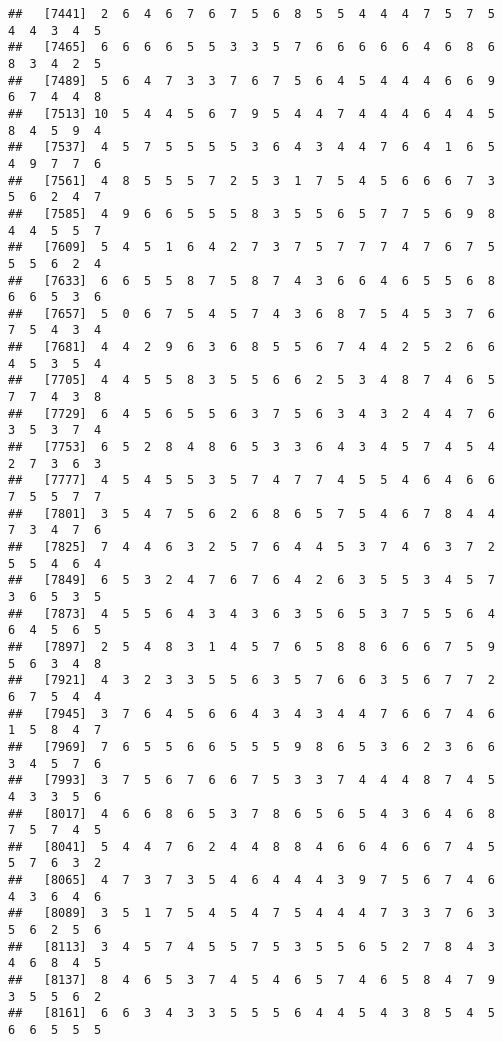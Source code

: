 \documentclass[
]{book}
\begin{document}
\begin{verbatim}
##   [7441]  2  6  4  6  7  6  7  5  6  8  5  5  4  4  4  7  5  7  5  4  4  3  4  5
##   [7465]  6  6  6  6  5  5  3  3  5  7  6  6  6  6  6  4  6  8  6  8  3  4  2  5
##   [7489]  5  6  4  7  3  3  7  6  7  5  6  4  5  4  4  4  6  6  9  6  7  4  4  8
##   [7513] 10  5  4  4  5  6  7  9  5  4  4  7  4  4  4  6  4  4  5  8  4  5  9  4
##   [7537]  4  5  7  5  5  5  5  3  6  4  3  4  4  7  6  4  1  6  5  4  9  7  7  6
##   [7561]  4  8  5  5  5  7  2  5  3  1  7  5  4  5  6  6  6  7  3  5  6  2  4  7
##   [7585]  4  9  6  6  5  5  5  8  3  5  5  6  5  7  7  5  6  9  8  4  4  5  5  7
##   [7609]  5  4  5  1  6  4  2  7  3  7  5  7  7  7  4  7  6  7  5  5  5  6  2  4
##   [7633]  6  6  5  5  8  7  5  8  7  4  3  6  6  4  6  5  5  6  8  6  6  5  3  6
##   [7657]  5  0  6  7  5  4  5  7  4  3  6  8  7  5  4  5  3  7  6  7  5  4  3  4
##   [7681]  4  4  2  9  6  3  6  8  5  5  6  7  4  4  2  5  2  6  6  4  5  3  5  4
##   [7705]  4  4  5  5  8  3  5  5  6  6  2  5  3  4  8  7  4  6  5  7  7  4  3  8
##   [7729]  6  4  5  6  5  5  6  3  7  5  6  3  4  3  2  4  4  7  6  3  5  3  7  4
##   [7753]  6  5  2  8  4  8  6  5  3  3  6  4  3  4  5  7  4  5  4  2  7  3  6  3
##   [7777]  4  5  4  5  5  3  5  7  4  7  7  4  5  5  4  6  4  6  6  7  5  5  7  7
##   [7801]  3  5  4  7  5  6  2  6  8  6  5  7  5  4  6  7  8  4  4  7  3  4  7  6
##   [7825]  7  4  4  6  3  2  5  7  6  4  4  5  3  7  4  6  3  7  2  5  5  4  6  4
##   [7849]  6  5  3  2  4  7  6  7  6  4  2  6  3  5  5  3  4  5  7  3  6  5  3  5
##   [7873]  4  5  5  6  4  3  4  3  6  3  5  6  5  3  7  5  5  6  4  6  4  5  6  5
##   [7897]  2  5  4  8  3  1  4  5  7  6  5  8  8  6  6  6  7  5  9  5  6  3  4  8
##   [7921]  4  3  2  3  3  5  5  6  3  5  7  6  6  3  5  6  7  7  2  6  7  5  4  4
##   [7945]  3  7  6  4  5  6  6  4  3  4  3  4  4  7  6  6  7  4  6  1  5  8  4  7
##   [7969]  7  6  5  5  6  6  5  5  5  9  8  6  5  3  6  2  3  6  6  3  4  5  7  6
##   [7993]  3  7  5  6  7  6  6  7  5  3  3  7  4  4  4  8  7  4  5  4  3  3  5  6
##   [8017]  4  6  6  8  6  5  3  7  8  6  5  6  5  4  3  6  4  6  8  7  5  7  4  5
##   [8041]  5  4  4  7  6  2  4  4  8  8  4  6  6  4  6  6  7  4  5  5  7  6  3  2
##   [8065]  4  7  3  7  3  5  4  6  4  4  4  3  9  7  5  6  7  4  6  4  3  6  4  6
##   [8089]  3  5  1  7  5  4  5  4  7  5  4  4  4  7  3  3  7  6  3  5  6  2  5  6
##   [8113]  3  4  5  7  4  5  5  7  5  3  5  5  6  5  2  7  8  4  3  4  6  8  4  5
##   [8137]  8  4  6  5  3  7  4  5  4  6  5  7  4  6  5  8  4  7  9  3  5  5  6  2
##   [8161]  6  6  3  4  3  3  5  5  5  6  4  4  5  4  3  8  5  4  5  6  6  5  5  5

\end{verbatim}
\end{document}
